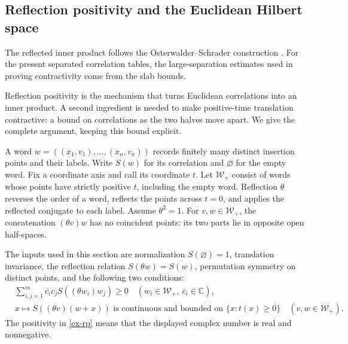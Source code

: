 \subsection{Reflection positivity and the Euclidean Hilbert space}
\label{ex-reflection}

The reflected inner product follows the Osterwalder--Schrader construction
\cite[\S3]{OS73}. For the present separated correlation tables, the
large-separation estimates used in proving contractivity come from the
slab bounds.


Reflection positivity is the mechanism that turns Euclidean correlations into
an inner product. A second ingredient is needed to make positive-time
translation contractive: a bound on correlations as the two halves move apart.
We give the complete argument, keeping this bound explicit.

A word \(w=((x_1,v_1),\ldots,(x_n,v_n))\) records finitely many distinct
insertion points and their labels. Write \(S(w)\) for its correlation and
\(\varnothing\) for the empty word. Fix a coordinate axis and call its
coordinate \(t\). Let \(\mathcal W_+\) consist of words whose points have
strictly positive \(t\), including the empty word. Reflection \(\theta\)
reverses the order of a word, reflects the points across \(t=0\), and
applies the reflected conjugate to each label. Assume \(\theta^2=1\).
For \(v,w\in\mathcal W_+\), the concatenation \((\theta v)w\) has no
coincident points: its two parts lie in opposite open half-spaces.

The inputs used in this section are normalization \(S(\varnothing)=1\),
translation invariance, the reflection relation
\(S(\theta w)=\overline{S(w)}\), permutation symmetry on distinct
points, and the following two conditions:
\begin{align}
 &\sum_{i,j=1}^m\overline{c_i}c_j S((\theta w_i)w_j)\ge0
       \quad(w_i\in\mathcal W_+,\ c_i\in\mathbb C),
       \label{ex-rp}\\
 &x\longmapsto S((\theta v)(w+x))
   \text{ is continuous and bounded on }\{x:t(x)\ge0\}
       \quad(v,w\in\mathcal W_+).\label{ex-cap}
\end{align}
The positivity in \eqref{ex-rp} means that the displayed complex number
is real and nonnegative.

